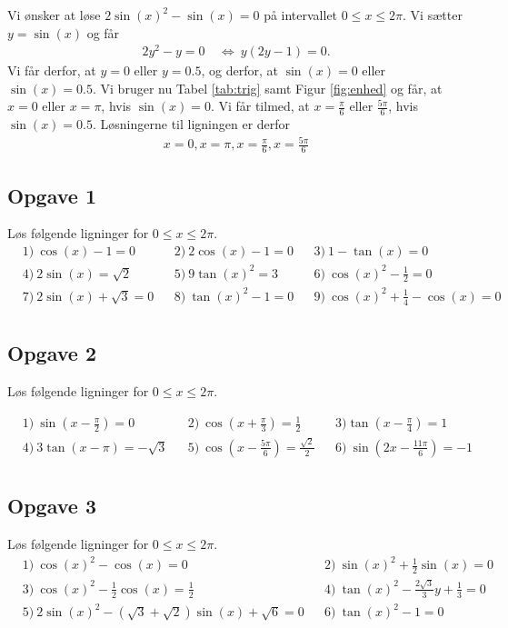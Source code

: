 \begin{exa}
	Vi ønsker at løse $2\sin(x)^2 - \sin(x) = 0$ på intervallet $0\leq x \leq 2\pi$. Vi sætter $y = \sin(x)$ og får
	\begin{align*}
		2y^2 - y = 0 \ &\Leftrightarrow \ y(2y - 1) = 0.
	\end{align*}
	Vi får derfor, at $y = 0$ eller $y = 0.5$, og derfor, at $\sin(x)=0$ eller $\sin(x)=0.5$. Vi bruger nu
	 Tabel \ref{tab:trig} samt Figur \ref{fig:enhed} og får, at $x = 0$ eller $x = \pi$, hvis $\sin(x) = 0$. 
	 Vi får tilmed, at $x = \frac{\pi}{6}$ eller $\frac{5\pi}{6}$, hvis $\sin(x) = 0.5.$ Løsningerne til ligningen er
	 derfor 
	 \begin{align*}
	 	x= 0, x = \pi, x = \frac{\pi}{6}, x = \frac{5\pi}{6}
	 \end{align*}
\end{exa}

\subsection*{Opgave 1}

Løs følgende ligninger for $0 \leq x \leq 2\pi$.
\begin{align*}
	&1) \  \cos(x) - 1 = 0   &&2) \  2\cos(x) - 1 = 0   &&3) \ 1 - \tan(x) = 0    \\
	&4) \  2\sin(x) = \sqrt{2}   &&5) \   9\tan(x)^2 = 3   &&6) \  \cos(x)^2 - \frac{1}{2} = 0   \\
	&7) \  2\sin(x) +\sqrt{3} = 0  &&8) \  \tan(x)^2 - 1 = 0    &&9) \ \cos(x)^2 + \frac{1}{4} - \cos(x) = 0    \\
\end{align*}

\subsection*{Opgave 2}

Løs følgende ligninger for $0 \leq x \leq 2\pi$. 

\begin{align*}
	&1) \  \sin\left( x - \frac{\pi}{2}\right) = 0  &&2) \  \cos\left( x + \frac{\pi}{3}\right) = \frac{1}{2}  
	 &&3) \tan\left( x - \frac{\pi}{4}\right) = 1  \\
	&4) \ 3\tan\left( x - \pi \right) = -\sqrt{3}   &&5) \   \cos\left( x - \frac{5\pi}{6}\right) = \frac{\sqrt{2}}{2}   &&6) \ \sin\left( 2x - \frac{11\pi}{6}\right) = -1   \\
\end{align*}

\subsection*{Opgave 3}
Løs følgende ligninger for $0 \leq x \leq 2\pi$.
\begin{align*}
	&1) \ \cos(x)^2 - \cos(x) = 0    &&2) \  \sin(x)^2 + \frac{1}{2}\sin(x) = 0    \\
	&3) \ \cos(x)^2 -\frac{1}{2}\cos(x) = \frac{1}{2}   &&4) \  \tan(x)^2 -\frac{2\sqrt{3}}{3}y+\frac{1}{3} = 0 \\
	&5) \  2\sin(x)^2 - (\sqrt{3}+\sqrt{2})\sin(x) + \sqrt{6} = 0     &&6) \  \tan(x)^2 - 1 = 0    \\
\end{align*}